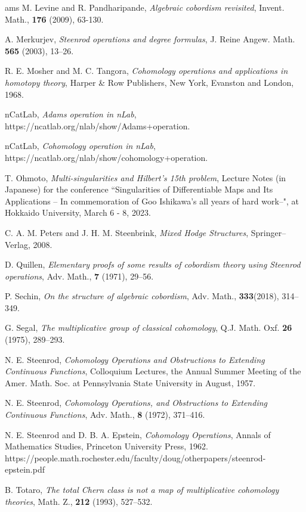 \documentclass[a4paper]{amsart}
\begin{document}
\begin{thebibliography}{ams}
M. Levine and R. Pandharipande,
{\it Algebraic cobordism revisited},
Invent. Math., {\bf 176} (2009), 63-130.

 A. Merkurjev, {\it Steenrod operations and degree formulas},  J. Reine Angew. Math. {\bf 565} (2003), 13--26.

 R. E. Mosher and M. C. Tangora, {\it Cohomology operations and applications in homotopy theory}, Harper \& Row Publishers, New York, Evanston and London, 1968.

 nCatLab, {\it Adams operation in nLab}, 
https://ncatlab.org/nlab/show/Adams+operation.

 nCatLab, {\it Cohomology operation in nLab}, 
https://ncatlab.org/nlab/show/cohomology+operation.

 T. Ohmoto, {\it Multi-singularities and Hilbert's 15th problem}, Lecture Notes (in Japanese) for the conference ``Singularities of Differentiable Maps and Its Applications -- In commemoration of Goo Ishikawa's all years of hard work--", at Hokkaido University, March 6 - 8, 2023.

 C. A. M. Peters and J. H. M. Steenbrink, {\it Mixed Hodge Structures}, Springer--Verlag, 2008. 

D. Quillen, {\it Elementary proofs of some results of cobordism theory using Steenrod
operations}, Adv. Math., {\bf 7} (1971), 29--56.

 P. Sechin, {\it On the structure of algebraic cobordism}, Adv. Math., {\bf 333}(2018), 314--349.

 G. Segal, {\it The multiplicative group of classical cohomology}, Q.J. Math. Oxf. {\bf 26} (1975), 289--293.

 N. E. Steenrod, {\it Cohomology Operations and Obstructions to Extending Continuous Functions}, Colloquium Lectures, the Annual Summer Meeting of the Amer. Math. Soc. at Pennsylvania State University in August, 1957.

 N. E. Steenrod, {\it Cohomology Operations, and Obstructions to Extending Continuous Functions}, Adv. Math., {\bf 8} (1972), 371--416.

 N. E. Steenrod and D. B. A. Epstein, {\it Cohomology Operations}, Annals of Mathematics Studies, Princeton University Press, 1962.
https://people.math.rochester.edu/faculty/doug/otherpapers/steenrod-epstein.pdf

 B. Totaro, {\it The total Chern class is not a map of multiplicative cohomology theories}, 
Math. Z., {\bf 212} (1993), 527--532.


\end{thebibliography}
\end{document}
